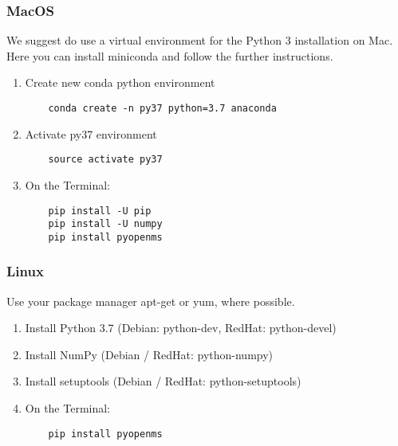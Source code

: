 {\subsubsection{MacOS}
We suggest do use a virtual environment for the Python 3 installation on Mac. 
Here you can install miniconda and follow the further instructions. \\

\begin{enumerate}
  \item Create new conda python environment
    \begin{listing}
\begin{verbatim}
    conda create -n py37 python=3.7 anaconda
    \end{verbatim}
\end{listing} 
    \item Activate py37 environment
    \begin{listing}
\begin{verbatim}
    source activate py37
    \end{verbatim}
\end{listing} 
  \item On the Terminal:
    \begin{listing}
\begin{verbatim}
    pip install -U pip
    pip install -U numpy
    pip install pyopenms
    \end{verbatim}
\end{listing}
\end{enumerate}

\subsubsection{Linux}
Use your package manager apt-get or yum, where possible.
\begin{enumerate}
  \item Install Python 3.7 (Debian: python-dev, RedHat: python-devel)
  \item Install NumPy (Debian / RedHat: python-numpy)
  \item Install setuptools (Debian / RedHat: python-setuptools)
  \item On the Terminal:
    \begin{listing}
\begin{verbatim}
    pip install pyopenms
    \end{verbatim}
\end{listing}
\end{enumerate}

}
